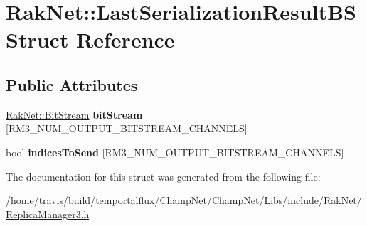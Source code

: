 \hypertarget{struct_rak_net_1_1_last_serialization_result_b_s}{\section{Rak\-Net\-:\-:Last\-Serialization\-Result\-B\-S Struct Reference}
\label{struct_rak_net_1_1_last_serialization_result_b_s}
}
\subsection*{Public Attributes}
\begin{DoxyCompactItemize}
\item 
\hypertarget{struct_rak_net_1_1_last_serialization_result_b_s_a265112e46d71a06e681ab8fe2b0e13f4}{\hyperlink{class_rak_net_1_1_bit_stream}{Rak\-Net\-::\-Bit\-Stream} {\bfseries bit\-Stream} \mbox{[}R\-M3\-\_\-\-N\-U\-M\-\_\-\-O\-U\-T\-P\-U\-T\-\_\-\-B\-I\-T\-S\-T\-R\-E\-A\-M\-\_\-\-C\-H\-A\-N\-N\-E\-L\-S\mbox{]}}\label{struct_rak_net_1_1_last_serialization_result_b_s_a265112e46d71a06e681ab8fe2b0e13f4}

\item 
\hypertarget{struct_rak_net_1_1_last_serialization_result_b_s_ae3ebb853658bda633d84ec4a1907e7fd}{bool {\bfseries indices\-To\-Send} \mbox{[}R\-M3\-\_\-\-N\-U\-M\-\_\-\-O\-U\-T\-P\-U\-T\-\_\-\-B\-I\-T\-S\-T\-R\-E\-A\-M\-\_\-\-C\-H\-A\-N\-N\-E\-L\-S\mbox{]}}\label{struct_rak_net_1_1_last_serialization_result_b_s_ae3ebb853658bda633d84ec4a1907e7fd}

\end{DoxyCompactItemize}


The documentation for this struct was generated from the following file\-:\begin{DoxyCompactItemize}
\item 
/home/travis/build/temportalflux/\-Champ\-Net/\-Champ\-Net/\-Libs/include/\-Rak\-Net/\hyperlink{_replica_manager3_8h}{Replica\-Manager3.\-h}\end{DoxyCompactItemize}
